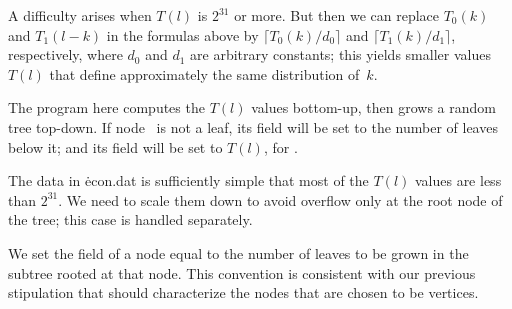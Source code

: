 A difficulty arises when $T(l)$ is $2^{31}$ or more. But then we can replace
$T_0(k)$ and $T_1(l-k)$ in the formulas above by $\lceil T_0(k)/d_0\rceil$
and $\lceil T_1(k)/d_1\rceil$, respectively, where $d_0$ and $d_1$ are
arbitrary constants; this yields smaller values
$T(l)$ that define approximately the same distribution of~$k$.

The program here computes the $T(l)$ values bottom-up, then grows a
random tree top-down. If node~ is not a leaf, its 
field
will be set to the number of leaves below it; and its  field
will be set to $T(l)$, for .

The data in \.{econ.dat} is sufficiently simple that most of the $T(l)$
values are less than $2^{31}$. We need to scale them
down to avoid overflow only at the root node of the tree; this
case is handled separately.

We set the  field of a node equal to the number of leaves to be
grown in the subtree rooted at that node. This convention is consistent
with our previous stipulation that  should characterize
the
nodes that are chosen to be vertices.

